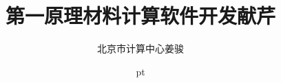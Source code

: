 \documentclass[cjk,slidestop,compress,mathserif,blue]{beamer}
\begin{document}

\renewcommand{\figurename}{\tiny{\bf Fig}.}
\renewcommand{\tablename}{\tiny{\bf Tab}.}
\renewcommand{\thesubfigure}{\tiny(\alph{subfigure})}  %

%

\title{第一原理材料计算软件开发献芹}

\author[]{北京市计算中心\;\;\:姜骏}
\institute[BCC]{\inst{}%
}
\date[\today] %
{	%
 pt {\fontsize{8.2pt}{6.2pt}}
}
\end{document}
